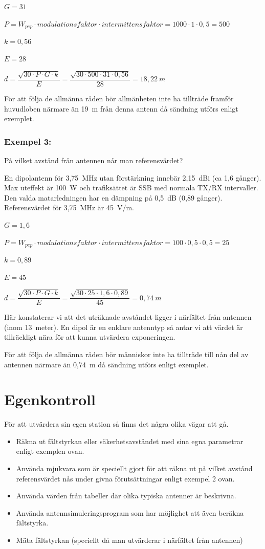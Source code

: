 \(G = 31\)

\(P = W_{pep} \cdot modulationsfaktor \cdot intermittensfaktor
= 1000 \cdot 1 \cdot 0,5 = 500\)

\(k = 0,56\)

\(E = 28\)

\(d = \dfrac{\sqrt{30 \cdot P \cdot G \cdot k}}{E}
= \dfrac{\sqrt{30 \cdot 500 \cdot 31 \cdot 0,56}}{28}
= 18,22\ m\)

För att följa de allmänna råden bör allmänheten inte ha tillträde framför
huvudloben närmare än 19~m från denna antenn då sändning utförs
enligt exemplet.

\subsubsection{Exempel 3:}

På vilket avstånd från antennen når man referensvärdet?

En dipolantenn för 3,75~MHz utan förstärkning innebär 2,15~dBi (ca 1,6 gånger).
Max uteffekt är 100~W och trafiksättet är SSB med normala TX/RX intervaller.
Den valda matarledningen har en dämpning på 0,5~dB (0,89 gånger).
Referensvärdet för 3,75~MHz är 45~V/m.

\(G = 1,6\)

\(P = W_{pep} \cdot modulationsfaktor \cdot intermittensfaktor
= 100 \cdot 0,5 \cdot 0,5 = 25\)

\(k = 0,89\)

\(E = 45\)

\(d = \dfrac{\sqrt{30 \cdot P \cdot G \cdot k}}{E} = \dfrac{\sqrt{30 \cdot 25 \cdot 1,6 \cdot 0,89}}{45}
= 0,74\ m\)

Här konstaterar vi att det uträknade avståndet ligger i närfältet från
antennen (inom 13~meter). En dipol är en enklare antenntyp så antar vi
att värdet är tillräckligt nära för att kunna utvärdera exponeringen.

För att följa de allmänna råden bör människor inte ha tillträde till
nån del av antennen närmare än 0,74~m då sändning utförs enligt exemplet.

\section{Egenkontroll}

För att utvärdera sin egen station så finns det några olika vägar att gå.

\begin{itemize}
\item Räkna ut fältstyrkan eller säkerhetsavståndet med sina egna
parametrar enligt exemplen ovan.
\item Använda mjukvara som är speciellt gjort för att räkna ut på
vilket avstånd referensvärdet nås under givna förutsättningar enligt
exempel 2 ovan.
\item Använda värden från tabeller där olika typiska antenner är beskrivna.
\item Använda antennsimuleringsprogram som har möjlighet att även
beräkna fältstyrka.
\item Mäta fältstyrkan (speciellt då man utvärderar i närfältet från antennen)
\end{itemize}


